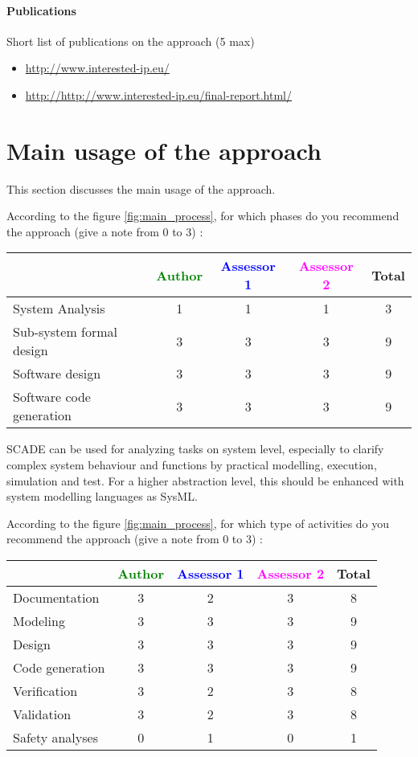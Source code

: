 \paragraph{Publications} Short list of publications on the approach (5 max)

\begin{itemize}
	\item \url{http://www.interested-ip.eu/}
  \item \url{http://http://www.interested-ip.eu/final-report.html/}

\end{itemize}

\section{Main usage of the approach}
\label{main_usage}
This section discusses the main usage of the approach.

According to the figure \ref{fig:main_process}, for which phases do you recommend the approach (give a note from 0 to  3) :

\begin{tabular}{|l | c | c | c | c|}
\hline
& \textcolor{green}{Author} & \textcolor{blue}{Assessor 1} & \textcolor{magenta}{Assessor 2} & Total \\
\hline 
System Analysis & 1  & 1 &1 & 3 \\
\hline
Sub-system  formal  design &  3 & 3 &3 & 9\\
\hline
Software design & 3  & 3 & 3 & 9 \\
\hline
Software code generation & 3 & 3 &3 & 9 \\
\hline
\end{tabular}

\begin{author_comment}
SCADE can be used for analyzing tasks on system level, especially to clarify complex system behaviour and functions by practical modelling, execution, simulation and test. For a higher abstraction level, this should be enhanced with system modelling languages as SysML.
\end{author_comment}
According to the figure \ref{fig:main_process}, for which type of activities do you recommend the approach (give a note from 0 to  3) :

\begin{tabular}{|l | c | c | c | c|}
\hline
& \textcolor{green}{Author} & \textcolor{blue}{Assessor 1} & \textcolor{magenta}{Assessor 2} & Total \\
\hline 
Documentation &  3  & 2 &3 & 8  \\
\hline
Modeling &  3  & 3 &3 &  9 \\
\hline
Design &  3  & 3 &3 & 9 \\
\hline
Code generation &  3  & 3 &3 & 9 \\
\hline
Verification &  3  & 2 &3 & 8 \\
\hline
Validation &  3  & 2 &3 & 8 \\
\hline
Safety analyses &  0  & 1 &0 & 1 \\
\hline
\end{tabular}


